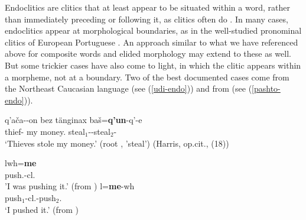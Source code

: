 \documentclass[output=paper]{langsci/langscibook}
\begin{document}
Endoclitics are clitics that at least appear to be situated within a word, rather than immediately preceding or following it, as clitics often do . 
In many cases, endoclitics appear at morphological boundaries, as in the well-studied pronominal clitics of European Portuguese  \citep{Crysmann2000a-lex}. An approach similar to what we have referenced above for composite words and elided morphology may extend to these as well. But some trickier cases have also come to light, in which the clitic appears within a morpheme, not at a boundary. Two of the best documented cases come from the Northeast Caucasian language  \citep{Harris2000} (see (\ref{udi-endo})) and from  \citep{Tegey1977,Roberts2000,Dost2007} (see (\ref{pashto-endo})).

\begin{exe}
	\ex\label{udi-endo}
	\gll q'a\v{c}a--on bez t\"{a}nginax ba\v{s}=\textbf{q'un}-q'-e \\
	thief- my money. steal$_{1}$--steal$_{2}$- \\
	\glt `Thieves stole my money.' (root , 'steal') (Harris, op.cit., (18))
\end{exe}


\begin{exe}
	\ex\label{pashto-endo}
	\begin{xlist}
		\ex\label{pashto-endo-a}
		\gll \textrtailt{}lwh=\textbf{me} \\
		push.-cl. \\
		\glt 'I was pushing it.' (from \citealt{Tegey1977,Dost2007})
		\ex\label{pashto-endo-b}
		\gll \textrtailt{}l=\textbf{me}-wh \\
		push$_{1}$-cl.-push$_{2}$. \\
		\glt `I pushed it.' (from \citealt{Tegey1977,Dost2007})
	\end{xlist}
\end{exe}
\end{document}
